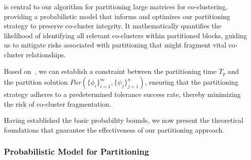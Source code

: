\documentclass[journal]{IEEEtran}
\theoremstyle{definition}
\theoremstyle{remark} %
\begin{document}
 is central to our algorithm for partitioning large matrices for co-clustering, providing a probabilistic model that informs and optimizes our partitioning strategy to preserve co-cluster integrity. It mathematically quantifies the likelihood of identifying all relevant co-clusters within partitioned blocks, guiding us to mitigate risks associated with partitioning that might fragment vital co-cluster relationships.

Based on~, we can establish a constraint between the partitioning time $T_p$ and the partition solution $Par(\{\phi_i\}_{i=1}^m, \{\psi_j\}_{j=1}^n)$, ensuring that the partitioning strategy adheres to a predetermined tolerance success rate, thereby minimizing the risk of co-cluster fragmentation.

Having established the basic probability bounds, we now present the theoretical foundations that guarantee the effectiveness of our partitioning approach.

\subsubsection{Probabilistic Model for Partitioning}
\label{subsec:probabilistic-model}
\end{document}
